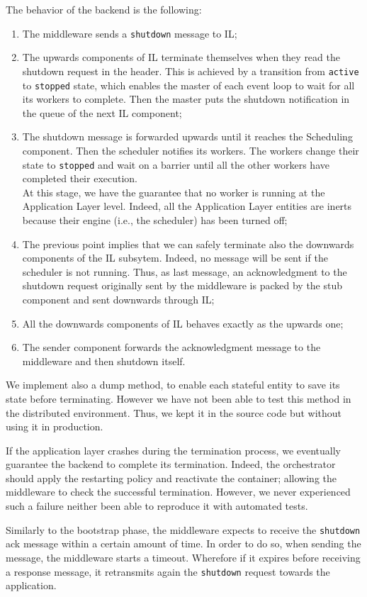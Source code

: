 The behavior of the backend is the following:


\begin{enumerate}
  \item The middleware sends a \verb|shutdown| message to IL;
  \item The upwards components of IL terminate themselves when they
  read the shutdown request in the header. This is achieved by a transition
  from \verb|active| to \verb|stopped| state, which enables the master
  of each event loop to wait for all its workers to complete. Then the master
  puts the shutdown notification in the queue of the next IL component;
  \item The shutdown message is forwarded upwards until it reaches the Scheduling
  component. Then the scheduler notifies its workers. The workers change their
  state to \verb|stopped| and wait on a barrier until all the other workers have
  completed their execution. \\
  At this stage, we have the guarantee that no worker is running at
  the Application Layer level. Indeed, all the Application Layer
  entities are inerts because their engine (i.e., the scheduler) has been
  turned off;
  \item The previous point implies that we can safely terminate
  also the downwards components of the IL subsytem. Indeed, no message
  will be sent if the scheduler is not running. Thus, as last message,
  an acknowledgment to the shutdown request
  originally sent by the middleware is packed
  by the stub component and sent downwards through IL;
  \item All the downwards components of IL behaves exactly as the upwards one;
  \item The sender component forwards the acknowledgment message
  to the middleware and then shutdown itself.
\end{enumerate}


We implement also a dump method, to enable each stateful entity to save its
state before terminating. However we have not
been able to test this method in the distributed environment. Thus, we
kept it in the source code but without using it in production.


If the application layer crashes during the termination process, we eventually
guarantee the backend to complete its termination. Indeed, the
orchestrator should apply the restarting policy and reactivate the container;
allowing the middleware to check the successful termination.
However, we never experienced
such a failure neither been able to reproduce it with automated tests.


Similarly to the bootstrap phase, the middleware expects to receive the
\verb|shutdown| ack message within a certain amount of time.
In order to do so, when sending the message, the middleware starts a timeout.
Wherefore if it expires before receiving a response message,
it retransmits again the \verb|shutdown| request towards the application.
